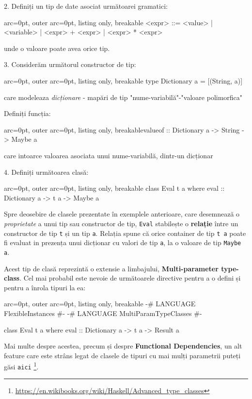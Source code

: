 2. Definiți un tip de date asociat următoarei gramatici:

\begin{tcblisting}{ arc=0pt, outer arc=0pt, listing only, breakable}
   <expr> ::= <value> | <variable> | <expr> + <expr> | <expr> * <expr> 

\end{tcblisting}

unde o valoare poate avea orice tip.

3. Considerăm următorul constructor de tip:

\begin{tcblisting}{ arc=0pt, outer arc=0pt, listing only, breakable}
type Dictionary a = [(String, a)]

\end{tcblisting}

care modeleaza \textit{dicționare} - mapări de tip "nume-variabilă"-"valoare polimorfica"

Definiți funcția:

\begin{tcblisting}{ arc=0pt, outer arc=0pt, listing only, breakable}valueof :: Dictionary a -> String -> Maybe a
\end{tcblisting}

care intoarce valoarea asociata unui nume-variabilă, dintr-un dicționar

4. Definiți următoarea clasă:

\begin{tcblisting}{ arc=0pt, outer arc=0pt, listing only, breakable}
class Eval t a where
    eval :: Dictionary a -> t a -> Maybe a

\end{tcblisting}


Spre deosebire de clasele prezentate în exemplele anterioare, care desemnează o \textit{proprietate} a unui tip sau constructor de tip, \texttt{Eval} stabilește o \textbf{relație} între un constructor de tip \texttt{t} și un tip \texttt{a}. Relația spune că orice container de tip \texttt{t a} poate fi evaluat in prezența unui dicționar cu valori de tip \texttt{a}, la o valoare de tip \texttt{Maybe a}.

\begin{tcolorbox}[colback=blue!10, colframe=blue!20]
Acest tip de clasă reprezintă o extensie a limbajului, \textbf{Multi-parameter type-class}.  Cel mai probabil este nevoie de următoarele directive pentru a o defini și pentru a înrola tipuri la ea:


\begin{tcblisting}{ arc=0pt, outer arc=0pt, listing only, breakable}
{-# LANGUAGE FlexibleInstances #-}
{-# LANGUAGE MultiParamTypeClasses #-}

class Eval t a where
    eval :: Dictionary a -> t a -> Result a

\end{tcblisting}


Mai multe despre acestea, precum și despre \textbf{Functional Dependencies}, un alt feature care este strâns legat de clasele de tipuri cu mai mulți parametrii puteți găsi \texttt{aici} \footnote{\url{https://en.wikibooks.org/wiki/Haskell/Advanced\_type\_classes}}.
\end{tcolorbox}

